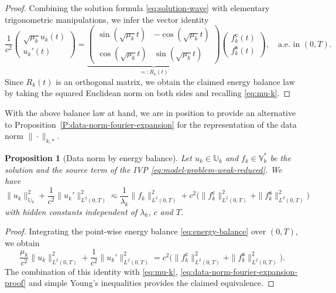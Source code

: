 \documentclass{amsart}
\theoremstyle{plain}
\newtheorem{proposition}[theorem]{Proposition}
\theoremstyle{remark}
\numberwithin{equation}{section}
\numberwithin{theorem}{section}
\newcommand{\trial}{\mathbb{U}}
\newcommand{\data}{\mathbb{V}^*}
\newcommand{\fsin}{f_{k}^{\mathtt{s}}}
\newcommand{\fcos}{f_{k}^{\mathtt{c}}}
\begin{document}
\begin{proof}
Combining the solution formula \eqref{eq:solution-wave} with elementary trigonometric manipulations, we infer the vector identity
\begin{equation*}
	\frac{1}{c^2}
	\begin{pmatrix}
		\sqrt{\mu_k}u_k(t)\\[3pt]
		u_k'(t)
	\end{pmatrix}
	=
	\underbrace{\begin{pmatrix}
		\sin(\sqrt{\mu_k}t) & -\cos(\sqrt{\mu_k}t)\\[3pt]
		\cos(\sqrt{\mu_k}t) &  \sin(\sqrt{\mu_k}t)
	\end{pmatrix}}_{=: R_k(t)}
	\begin{pmatrix}
		\fcos(t)\\[3pt]
		\fsin(t)
	\end{pmatrix}, 
	\quad \text{a.e. in $(0,T)$}.
\end{equation*}
Since $R_k(t)$ is an orthogonal matrix, we obtain the claimed energy balance law by taking the squared Euclidean norm on both sides and recalling \eqref{eq:mu-k}.
\end{proof}

With the above balance law at hand, we are in position to provide an alternative to Proposition~\ref{P:data-norm-fourier-expansion} for the representation of the data norm $\|\cdot\|_{k,*}$.

\begin{proposition}[Data norm by energy balance]
	\label{P:data-norm-energy-balance}
	Let $u_{k} \in \trial_k$ and $f_k \in \data_k$ be the solution and the source term of the IVP \eqref{eq:model-problem-weak-reduced}. We have
	\begin{equation}
		\label{eq:data-norm-energy-balance}
		\|u_k\|^2_{\trial_k} + \frac{1}{c^2} \|u_k'\|^2_{L^2(0,T)} 
		\eqsim 
		\frac{1}{\lambda_k}\|f_k\|^2_{L^2(0,T)} +
		c^2\Big (\|\fcos\|^2_{L^2(0,T)} + \|\fsin\|^2_{L^2(0,T)} \Big )
	\end{equation}
	with hidden constants independent of $\lambda_k$, $c$ and $T$. 
\end{proposition}  

\begin{proof}
Integrating the point-wise energy balance \eqref{eq:energy-balance} over $(0,T)$, we obtain	
\[
\frac{\mu_k}{c^2}\|u_k\|^2_{L^2(0,T)} + \frac{1}{c^2}\|u_k'\|^2_{L^2(0,T)} 
=
c^2\Big (\|\fcos\|^2_{L^2(0,T)} + \|\fsin\|^2_{L^2(0,T)} \Big ).
\]
The combination of this identity with \eqref{eq:mu-k}, \eqref{eq:data-norm-fourier-expansion-proof} and simple Young's inequalities provides the claimed equivalence.
\end{proof}
\end{document}
